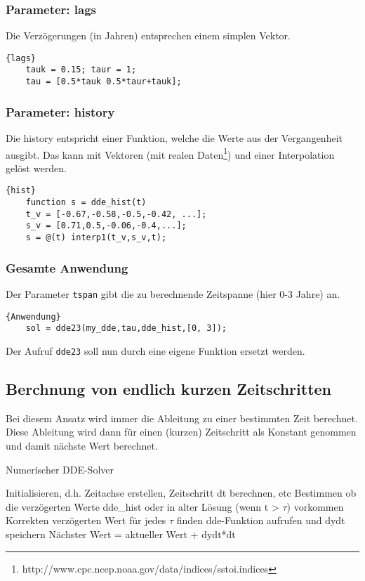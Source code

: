 \subsubsection{Parameter: lags}
Die Verzögerungen (in Jahren) entsprechen einem simplen Vektor.
\begin{lstlisting}[style=MATLAB]{lags}
	tauk = 0.15; taur = 1;
	tau = [0.5*tauk 0.5*taur+tauk];
\end{lstlisting}

\subsubsection{Parameter: history}
Die history entspricht einer Funktion, welche die Werte aus der Vergangenheit ausgibt. 
Das kann mit Vektoren (mit realen Daten\footnote{http://www.cpc.ncep.noaa.gov/data/indices/sstoi.indices}) und einer Interpolation gelöst werden.
\begin{lstlisting}[style=MATLAB]{hist}
	function s = dde_hist(t)
	t_v = [-0.67,-0.58,-0.5,-0.42, ...];
	s_v = [0.71,0.5,-0.06,-0.4,...];  
	s = @(t) interp1(t_v,s_v,t);
\end{lstlisting}

\subsubsection{Gesamte Anwendung}
Der Parameter \texttt{tspan} gibt die zu berechnende Zeitspanne (hier 0-3 Jahre) an.
\begin{lstlisting}[style=MATLAB]{Anwendung}
	sol = dde23(my_dde,tau,dde_hist,[0, 3]);
\end{lstlisting}
Der Aufruf \texttt{dde23} soll nun durch eine eigene Funktion ersetzt werden.
 

\subsection{Berchnung von endlich kurzen Zeitschritten}
Bei diesem Ansatz wird immer die Ableitung zu einer bestimmten Zeit berechnet.
Diese Ableitung wird dann für einen (kurzen) Zeitschritt als Konstant genommen und damit nächste Wert berechnet.
\begin{algorithm}
	\caption{Numerischer DDE-Solver}
	\label{algo1}
	\begin{algorithmic}[1]
		\State Initialisieren, d.h. Zeitachse erstellen, Zeitschritt dt berechnen, etc
		\State Bestimmen ob die verzögerten Werte dde\_hist oder in alter Lösung (wenn t > $\tau$) vorkommen
		\State Korrekten verzögerten Wert für jedes $\tau$ finden
		\EndFor
		\State dde-Funktion aufrufen und dydt speichern
		\State Nächster Wert = aktueller Wert + dydt*dt
		\EndFor
	\end{algorithmic}
\end{algorithm}

